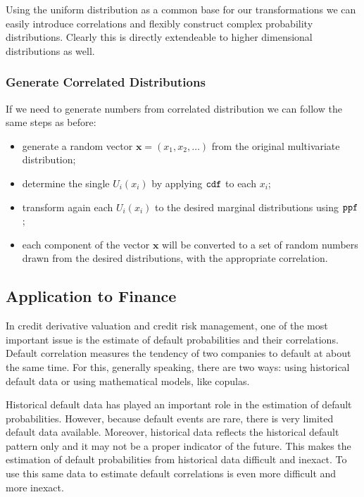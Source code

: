 \documentclass[11pt]{article}
\providecommand{\tightlist}{%
      \setlength{\itemsep}{0pt}\setlength{\parskip}{0pt}}
\begin{document}
    Using the uniform distribution as a common base for our transformations
we can easily introduce correlations and flexibly construct complex
probability distributions. Clearly this is directly extendeable to
higher dimensional distributions as well.

\hypertarget{generate-correlated-distributions}{%
\subsubsection{Generate Correlated
Distributions}\label{generate-correlated-distributions}}

If we need to generate numbers from correlated distribution we can
follow the same steps as before:

\begin{itemize}
\tightlist
\item
  generate a random vector \(\mathbf{x}=(x_1, x_2,\ldots)\) from the
  original multivariate distribution;
\item
  determine the single \(U_i(x_i)\) by applying \(\tt{cdf}\) to each
  \(x_i\);
\item
  transform again each \(U_i(x_i)\) to the desired marginal
  distributions using \(\tt{ppf}\);
\item
  each component of the vector \(\mathbf{x}\) will be converted to a set
  of random numbers drawn from the desired distributions, with the
  appropriate correlation.
\end{itemize}

    \hypertarget{application-to-finance}{%
\subsection{Application to Finance}\label{application-to-finance}}

In credit derivative valuation and credit risk management, one of the
most important issue is the estimate of default probabilities and their
correlations. Default correlation measures the tendency of two companies
to default at about the same time. For this, generally speaking, there
are two ways: using historical default data or using mathematical
models, like copulas.

Historical default data has played an important role in the estimation
of default probabilities. However, because default events are rare,
there is very limited default data available. Moreover, historical data
reflects the historical default pattern only and it may not be a proper
indicator of the future. This makes the estimation of default
probabilities from historical data difficult and inexact. To use this
same data to estimate default correlations is even more difficult and
more inexact.
\end{document}
